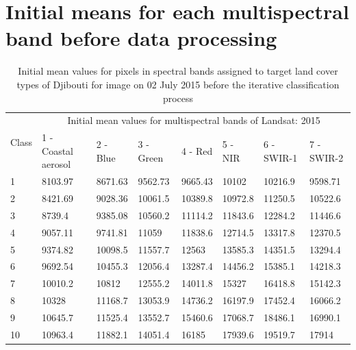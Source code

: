 \documentclass[jimaging,article,submit,pdftex,moreauthors]{Definitions/mdpi}
\begin{document}
\appendixstart
\appendix

\section[\appendixname~\thesection]{Initial means for each multispectral band before data processing}\label{AppA}

\begin{table}[H]
  \centering
  \begin{tabularx}{\textwidth}{p{0.7cm}p{2.5cm}p{1.0cm}p{1.3cm}p{1.0cm}p{1.0cm}p{1.5cm}p{1.5cm}}
  \toprule
  \multirow{2}{*}{Class} & \multicolumn{7}{c}{Initial mean values for multispectral bands of Landsat:  2015} \\
     & 1 - Coastal aerosol & 2 - Blue & 3 - Green & 4 - Red & 5 - NIR & 6 - SWIR-1 & 7 - SWIR-2 \\
    \midrule
    1 & 8103.97 & 8671.63 & 9562.73 & 9665.43 & 10102 & 10216.9 & 9598.71 \\
    2 & 8421.69 & 9028.36 & 10061.5 & 10389.8 & 10972.8 & 11250.5 & 10522.6 \\
    3 & 8739.4 & 9385.08 &10560.2 & 11114.2 & 11843.6 & 12284.2 & 11446.6 \\
    4 & 9057.11 & 9741.81 & 11059 & 11838.6 & 12714.5 & 13317.8 & 12370.5 \\
    5 & 9374.82 & 10098.5 & 11557.7 & 12563 & 13585.3 & 14351.5 & 13294.4 \\
    6 & 9692.54 & 10455.3 & 12056.4 & 13287.4 & 14456.2 & 15385.1 & 14218.3 \\
    7 & 10010.2 & 10812 & 12555.2 & 14011.8 & 15327 & 16418.8 & 15142.3 \\
    8 & 10328 & 11168.7 & 13053.9 & 14736.2 & 16197.9 & 17452.4 & 16066.2 \\
    9 & 10645.7 & 11525.4 & 13552.7 & 15460.6 & 17068.7 & 18486.1 & 16990.1 \\
    10 & 10963.4 & 11882.1 & 14051.4 & 16185 & 17939.6 & 19519.7 & 17914 \\
\bottomrule
\end{tabularx}
  \caption{Initial mean values for pixels in spectral bands assigned to target land cover types of Djibouti for image on 02 July 2015 before the iterative classification process}
  \label{tabA1} 
\end{table} 
\end{document}
